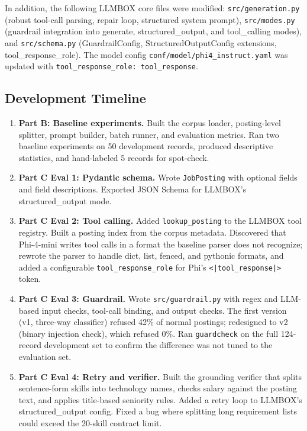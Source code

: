 \documentclass[11pt]{article}
\begin{document}
In addition, the following LLMBOX core files were modified: \texttt{src/generation.py} (robust tool-call parsing, repair loop, structured system prompt), \texttt{src/modes.py} (guardrail integration into generate, structured\_output, and tool\_calling modes), and \texttt{src/schema.py} (GuardrailConfig, StructuredOutputConfig extensions, tool\_response\_role). The model config \texttt{conf/model/phi4\_instruct.yaml} was updated with \texttt{tool\_response\_role: tool\_response}.

\subsection{Development Timeline}

\begin{enumerate}[leftmargin=*]
\item \textbf{Part B: Baseline experiments.} Built the corpus loader, posting-level splitter, prompt builder, batch runner, and evaluation metrics. Ran two baseline experiments on 50 development records, produced descriptive statistics, and hand-labeled 5 records for spot-check.

\item \textbf{Part C Eval 1: Pydantic schema.} Wrote \texttt{JobPosting} with optional fields and field descriptions. Exported JSON Schema for LLMBOX's structured\_output mode.

\item \textbf{Part C Eval 2: Tool calling.} Added \texttt{lookup\_posting} to the LLMBOX tool registry. Built a posting index from the corpus metadata. Discovered that Phi-4-mini writes tool calls in a format the baseline parser does not recognize; rewrote the parser to handle dict, list, fenced, and pythonic formats, and added a configurable \texttt{tool\_response\_role} for Phi's \texttt{<|tool\_response|>} token.

\item \textbf{Part C Eval 3: Guardrail.} Wrote \texttt{src/guardrail.py} with regex and LLM-based input checks, tool-call binding, and output checks. The first version (v1, three-way classifier) refused 42\% of normal postings; redesigned to v2 (binary injection check), which refused 0\%. Ran \texttt{guardcheck} on the full 124-record development set to confirm the difference was not tuned to the evaluation set.

\item \textbf{Part C Eval 4: Retry and verifier.} Built the grounding verifier that splits sentence-form skills into technology names, checks salary against the posting text, and applies title-based seniority rules. Added a retry loop to LLMBOX's structured\_output config. Fixed a bug where splitting long requirement lists could exceed the 20-skill contract limit.


\end{enumerate}
\end{document}
